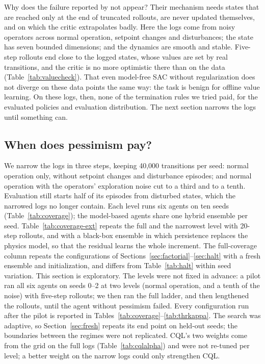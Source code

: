 \documentclass[11pt]{article}
\begin{document}
Why does the failure reported by \citet{sims2024edge} not appear? Their mechanism needs states that are reached only at the end of truncated rollouts, are never updated themselves, and on which the critic extrapolates badly. Here the logs come from noisy operators across normal operation, setpoint changes and disturbances; the state has seven bounded dimensions; and the dynamics are smooth and stable. Five-step rollouts end close to the logged states, whose values are set by real transitions, and the critic is no more optimistic there than on the data (Table~\ref{tab:valuecheck}). That even model-free SAC without regularization does not diverge on these data points the same way: the task is benign for offline value learning. On these logs, then, none of the termination rules we tried paid, for the evaluated policies and evaluation distribution. The next section narrows the logs until something can.

\subsection{When does pessimism pay?}\label{sec:coverage}

We narrow the logs in three steps, keeping 40{,}000 transitions per seed: normal operation only, without setpoint changes and disturbance episodes; and normal operation with the operators' exploration noise cut to a third and to a tenth. Evaluation still starts half of its episodes from disturbed states, which the narrowed logs no longer contain. Each level runs six agents on ten seeds (Table~\ref{tab:coverage}); the model-based agents share one hybrid ensemble per seed. Table~\ref{tab:coverage-ext} repeats the full and the narrowest level with 20-step rollouts, and with a black-box ensemble in which persistence replaces the physics model, so that the residual learns the whole increment. The full-coverage column repeats the configurations of Sections~\ref{sec:factorial}--\ref{sec:halt} with a fresh ensemble and initialization, and differs from Table~\ref{tab:halt} within seed variation. This section is exploratory. The levels were not fixed in advance: a pilot ran all six agents on seeds 0--2 at two levels (normal operation, and a tenth of the noise) with five-step rollouts; we then ran the full ladder, and then lengthened the rollouts, until the agent without pessimism failed. Every configuration run after the pilot is reported in Tables~\ref{tab:coverage}--\ref{tab:thrkappa}. The search was adaptive, so Section~\ref{sec:fresh} repeats its end point on held-out seeds; the boundaries between the regimes were not replicated. CQL's two weights come from the grid on the full logs (Table~\ref{tab:cqlalpha}) and were not re-tuned per level; a better weight on the narrow logs could only strengthen CQL.
\end{document}
